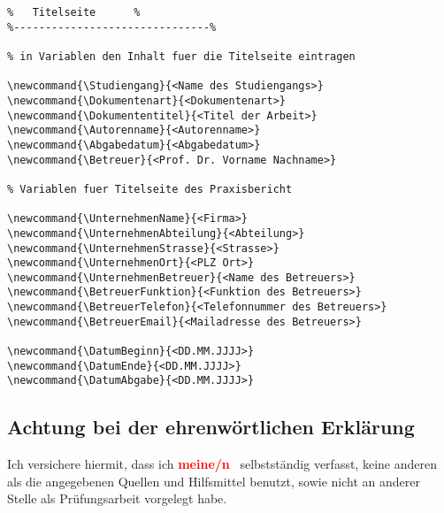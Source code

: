 \begin{lstlisting}[caption={Variablen für Titelseite}, label=code: Variablen Titelseite]
%-------------------------------%
%	Titelseite		%
%-------------------------------%

% in Variablen den Inhalt fuer die Titelseite eintragen

\newcommand{\Studiengang}{<Name des Studiengangs>}
\newcommand{\Dokumentenart}{<Dokumentenart>}
\newcommand{\Dokumententitel}{<Titel der Arbeit>}
\newcommand{\Autorenname}{<Autorenname>}
\newcommand{\Abgabedatum}{<Abgabedatum>}
\newcommand{\Betreuer}{<Prof. Dr. Vorname Nachname>}

% Variablen fuer Titelseite des Praxisbericht

\newcommand{\UnternehmenName}{<Firma>}
\newcommand{\UnternehmenAbteilung}{<Abteilung>}
\newcommand{\UnternehmenStrasse}{<Strasse>}
\newcommand{\UnternehmenOrt}{<PLZ Ort>}
\newcommand{\UnternehmenBetreuer}{<Name des Betreuers>}
\newcommand{\BetreuerFunktion}{<Funktion des Betreuers>}
\newcommand{\BetreuerTelefon}{<Telefonnummer des Betreuers>}
\newcommand{\BetreuerEmail}{<Mailadresse des Betreuers>}

\newcommand{\DatumBeginn}{<DD.MM.JJJJ>}
\newcommand{\DatumEnde}{<DD.MM.JJJJ>}
\newcommand{\DatumAbgabe}{<DD.MM.JJJJ>}
\end{lstlisting}



\subsection{Achtung bei der ehrenwörtlichen Erklärung}

Ich versichere hiermit, dass ich \textcolor{red}{\textbf{meine/n}} \Dokumentenart \ selbstständig verfasst, keine anderen als die angegebenen Quellen und Hilfsmittel benutzt, sowie nicht an anderer Stelle als Prüfungsarbeit vorgelegt habe.
